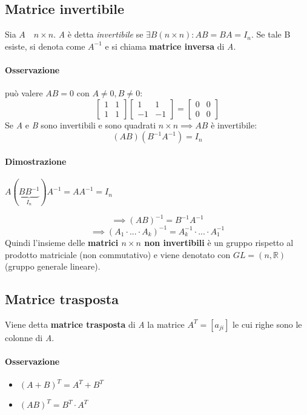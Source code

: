 		\subsection{Matrice invertibile}
			Sia $ A \quad n \times n $. \textit{A} è detta \textit{invertibile} se $ \exists B (n \times n) : AB = BA = I_n $.
			Se tale B esiste, si denota come $ A^{-1} $ e si chiama \textbf{matrice inversa} di \textit{A}.
		
			\paragraph{Osservazione} può valere $ AB = 0 $ con $ A \neq 0 , B \neq 0 $:
			$$
			\begin{bmatrix}
				1 & 1 \\ 
				1 & 1
			\end{bmatrix}
			\begin{bmatrix}
				1 & 1 \\ 
				-1 & -1
			\end{bmatrix}
			=
			\begin{bmatrix}
				0 & 0 \\
				0 & 0
			\end{bmatrix}
			$$
			Se \textit{A} e \textit{B} sono invertibili e sono quadrati $ n \times n \implies AB $ è invertibile:
			$$ (AB)(B^{-1}A^{-1}) = I_n $$ 
			\begin{GrayBox}
				\paragraph{Dimostrazione}
				$A (\underbrace{BB^{-1}}_{I_n}) A^{-1} = AA^{-1} = I_n $
			\end{GrayBox}
			
			$$ \implies (AB)^{-1} = B^{-1} A^{-1} $$
			$$ \implies (A_1 \cdot ... \cdot A_k)^{-1} = A_{k}^{-1} \cdot ... \cdot A_{1}^{-1} $$
			Quindi l'insieme delle \textbf{matrici $n \times n$ non invertibili} è un gruppo rispetto al prodotto matriciale (non commutativo) e viene denotato con $ GL = (n, \mathbb{R}) $ (gruppo generale lineare).
		
		\subsection{Matrice trasposta}
			Viene detta \textbf{matrice trasposta} di \textit{A} la matrice $ A^T = [a_{ji}] $ le cui righe sono le colonne di \textit{A}.
			\paragraph{Osservazione}
			\begin{itemize}
				\item $ (A + B)^T = A^T + B^T $
				\item $ (AB)^T = B^T \cdot A^T $
			\end{itemize}
		
